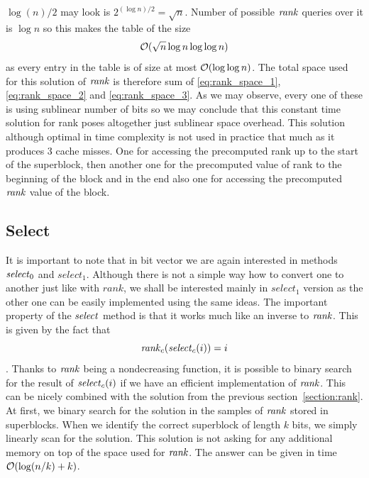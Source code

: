 $\log(n)/2$ may look is $2^{(\log n)/2} = \sqrt{n}$. Number of possible $\mathit{rank}$
queries over it is $\log n$ so this makes the table of the size
\begin{equation}
    \mathcal{O}(\sqrt{n}\log n\log\log n)
    \label{eq:rank_space_3}
\end{equation}
as every entry in the table is of size at most $\mathcal{O}(\log\log n)$. The total space used for
this solution of $\mathit{rank}$ is therefore sum of \ref{eq:rank_space_1}, \ref{eq:rank_space_2} and
\ref{eq:rank_space_3}. As we may observe, every one of these is using sublinear number of bits so
we may conclude that this constant time solution for rank poses altogether just sublinear space overhead.
This solution although optimal in time complexity is not used in practice that much as it produces
3 cache misses. One for accessing the precomputed rank up to the start of the superblock, then
another one for the precomputed value of rank to the beginning of the block and in the end also one
for accessing the precomputed $\mathit{rank}$ value of the block.


\subsection{Select}
\label{section:select}

It is important to note that in bit vector we are again interested in methods $\mathit{select}_0$
and $select_1$. Although there is not a simple way how to convert one to another just like with
$rank$, we shall be interested mainly in $select_1$ version as the other one can be easily
implemented using the same ideas. The important property of the $\mathit{select}$ method is that it
works much like an inverse to $\mathit{rank}$. This is given by the fact that
                $$\mathit{rank}_c(\mathit{select}_c(i)) = i$$.
Thanks to $\mathit{rank}$ being a nondecreasing function, it is possible to binary search for the result
of $\mathit{select}_c(i)$ if we have an efficient implementation of $\mathit{rank}$. This can be nicely combined
with the solution from the previous section~\ref{section:rank}. At first, we binary search for
the solution in the samples of $\mathit{rank}$ stored in superblocks. When we identify the correct
superblock of length $k$ bits, we simply linearly scan for the solution. This solution is not
asking for any additional memory on top of the space used for $\mathit{rank}$. The answer can be given
in time $\mathcal{O}(\log(n/k)+k)$.

